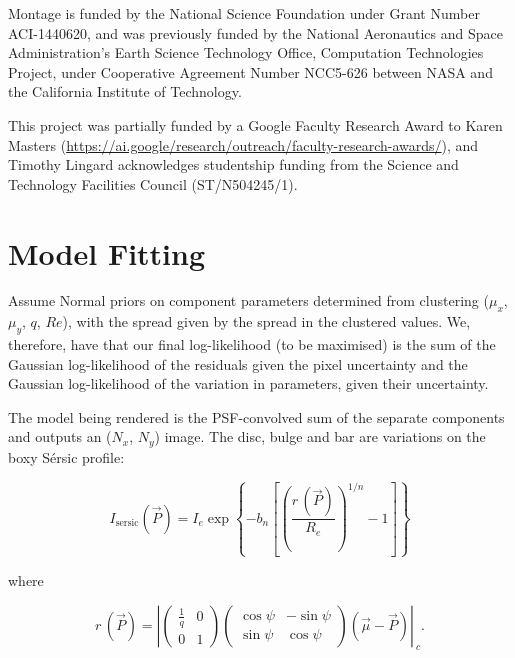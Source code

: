 \documentclass[trackchanges]{aastex63}
\begin{document}
Montage is funded by the National Science Foundation under Grant Number ACI-1440620, and was previously funded by the National Aeronautics and Space Administration's Earth Science Technology Office, Computation Technologies Project, under Cooperative Agreement Number NCC5-626 between NASA and the California Institute of Technology.

This project was partially funded by a Google Faculty Research Award to Karen Masters (\url{https://ai.google/research/outreach/faculty-research-awards/}), and Timothy Lingard acknowledges studentship funding from the Science and Technology Facilities Council (ST/N504245/1).

\appendix

\section{Model Fitting}

\label{sec:appendix-model-fitting}

Assume Normal priors on component parameters determined from clustering ($\mu_x$, $\mu_y$, $q$, $Re$), with the spread given by the spread in the clustered values. We, therefore, have that our final log-likelihood (to be maximised) is the sum of the Gaussian log-likelihood of the residuals given the pixel uncertainty and the Gaussian log-likelihood of the variation in parameters, given their uncertainty.

The model being rendered is the PSF-convolved sum of the separate components and outputs an ($N_x$, $N_y$) image. The disc, bulge and bar are variations on the boxy S\'ersic profile:

\begin{equation}
I_\mathrm{sersic}(\vec{P}) = I_e \exp\left\{-b_n\left[\left(\frac{r\,(\vec{P})}{R_e}\right)^{1/n} - 1\right]\right\}
\end{equation}

where

\begin{equation}
r\,(\vec{P}) = \left|\begin{pmatrix}
\frac{1}{q} & 0 \\
0 & 1
\end{pmatrix}\begin{pmatrix}
\cos\psi & -\sin\psi\\
\sin\psi & \cos\psi
\end{pmatrix}\left(\vec\mu - \vec{P}\right)\right|_{\ c}.
\end{equation}
\end{document}
